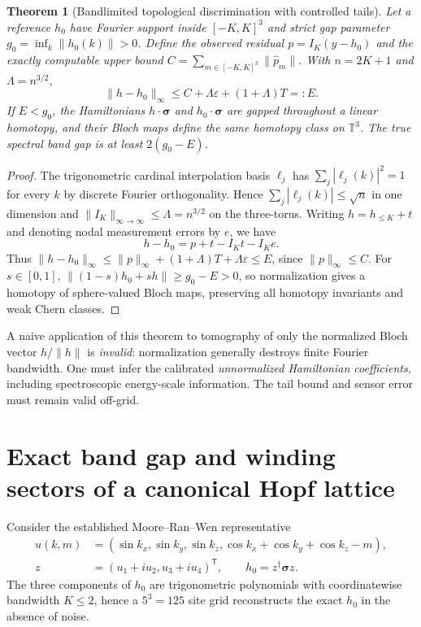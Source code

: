 \documentclass[aps,prd,onecolumn,notitlepage,11pt,superscriptaddress,longbibliography]{revtex4-2}
\newtheorem{theorem}{Theorem}
\begin{document}
\begin{theorem}[Bandlimited topological discrimination with controlled tails]\label{th:fourier}
Let a reference $h_0$ have Fourier support inside $[-K,K]^3$ and
strict gap parameter $g_0=\inf_k\|h_0(k)\|>0$.
Define the observed residual $p=I_K(y-h_0)$ and the exactly
computable upper bound
$C=\sum_{m\in[-K,K]^3}\|\widehat p_m\|$.
With $n=2K+1$ and $\Lambda=n^{3/2}$,
\begin{equation}\label{eq:fourier}
\boxed{\|h-h_0\|_\infty\le
 C+\Lambda\varepsilon+(1+\Lambda)T=:E.}
\end{equation}
If $\boxed{E<g_0}$, the Hamiltonians $h\cdot\bm\sigma$ and
$h_0\cdot\bm\sigma$ are gapped throughout a linear homotopy,
and their Bloch maps define the same homotopy class on $\mathbb T^3$.
The true spectral band gap is at least $2(g_0-E)$.
\end{theorem}
\begin{proof}
The trigonometric cardinal interpolation basis $\ell_j$ has
$\sum_j|\ell_j(k)|^2=1$ for every $k$ by discrete Fourier
orthogonality. Hence
$\sum_j|\ell_j(k)|\le\sqrt n$ in one dimension
and $\|I_K\|_{\infty\to\infty}\le\Lambda=n^{3/2}$ on the
three-torus. Writing $h=h_{\le K}+t$ and denoting nodal
measurement errors by $e$, we have
\begin{equation}
 h-h_0=p+t-I_Kt-I_Ke.
\end{equation}
Thus $\|h-h_0\|_\infty\le \|p\|_\infty+(1+\Lambda)T+
\Lambda\varepsilon\le E$, since
$\|p\|_\infty\le C$. For $s\in[0,1]$,
$\|(1-s)h_0+sh\|\ge g_0-E>0$, so normalization gives
a homotopy of sphere-valued Bloch maps, preserving all homotopy
invariants and weak Chern classes.
\end{proof}

A naive application of this theorem to tomography of only the
normalized Bloch vector $h/\|h\|$ is \emph{invalid}: normalization
generally destroys finite Fourier bandwidth. One must infer the
calibrated \emph{unnormalized Hamiltonian coefficients}, including
spectroscopic energy-scale information. The tail bound and sensor
error must remain valid off-grid.

\section{Exact band gap and winding sectors of a canonical Hopf lattice}
Consider the established Moore--Ran--Wen representative
\cite{Moore2008,MRWScaling2021}
\begin{align}
 u(k,m)&=(\sin k_x,\sin k_y,\sin k_z,
                 \cos k_x+\cos k_y+\cos k_z-m),\\
 z&=(u_1+i u_2,u_3+i u_4)^\mathsf T,\qquad
 h_0=z^\dagger\bm\sigma z.
\end{align}
The three components of $h_0$ are trigonometric polynomials with
coordinatewise bandwidth $K\le2$, hence a $5^3=125$ site grid
reconstructs the exact $h_0$ in the absence of noise.
\end{document}
